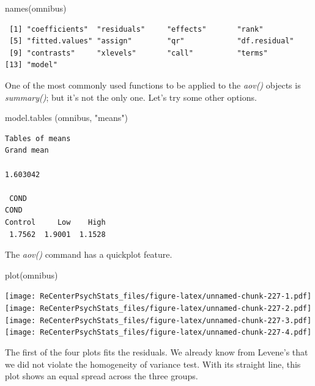 \documentclass[
  11pt,
]{book}
\newenvironment{Shaded}{\begin{snugshade}}{\end{snugshade}}
\newcommand{\FunctionTok}[1]{\textcolor[rgb]{0.00,0.00,0.00}{#1}}
\newcommand{\NormalTok}[1]{#1}
\newcommand{\StringTok}[1]{\textcolor[rgb]{0.31,0.60,0.02}{#1}}
\begin{document}
\begin{Shaded}
\begin{Highlighting}[]
\FunctionTok{names}\NormalTok{(omnibus)}
\end{Highlighting}
\end{Shaded}

\begin{verbatim}
 [1] "coefficients"  "residuals"     "effects"       "rank"         
 [5] "fitted.values" "assign"        "qr"            "df.residual"  
 [9] "contrasts"     "xlevels"       "call"          "terms"        
[13] "model"        
\end{verbatim}

One of the most commonly used functions to be applied to the \emph{aov()} objects is \emph{summary()}; but it's not the only one. Let's try some other options.

\begin{Shaded}
\begin{Highlighting}[]
\FunctionTok{model.tables}\NormalTok{ (omnibus, }\StringTok{"means"}\NormalTok{)}
\end{Highlighting}
\end{Shaded}

\begin{verbatim}
Tables of means
Grand mean
         
1.603042 

 COND 
COND
Control     Low    High 
 1.7562  1.9001  1.1528 
\end{verbatim}

The \emph{aov()} command has a quickplot feature.

\begin{Shaded}
\begin{Highlighting}[]
\FunctionTok{plot}\NormalTok{(omnibus) }
\end{Highlighting}
\end{Shaded}

\texttt{[image: ReCenterPsychStats\_files/figure-latex/unnamed-chunk-227-1.pdf]} \texttt{[image: ReCenterPsychStats\_files/figure-latex/unnamed-chunk-227-2.pdf]} \texttt{[image: ReCenterPsychStats\_files/figure-latex/unnamed-chunk-227-3.pdf]} \texttt{[image: ReCenterPsychStats\_files/figure-latex/unnamed-chunk-227-4.pdf]}

The first of the four plots fits the residuals. We already know from Levene's that we did not violate the homogeneity of variance test. With its straight line, this plot shows an equal spread across the three groups.
\end{document}
